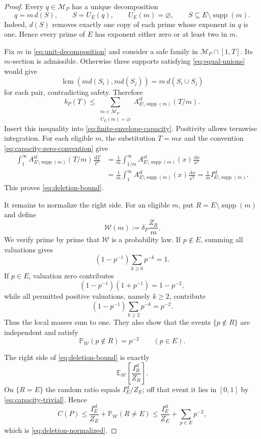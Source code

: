 \documentclass[11pt]{article}
\numberwithin{equation}{section}
\theoremstyle{plain}
\newcommand{\Pp}{\mathbb P}
\newcommand{\E}{\mathbb E}
\newcommand{\1}{\mathbf 1}
\newcommand{\dd}{\,\mathrm d}
\newcommand{\cM}{\mathcal M}
\newcommand{\supp}{\operatorname{supp}}
\newcommand{\lcm}{\operatorname{lcm}}
\begin{document}
\begin{proof}
Every $q\in\cM_P$ has a unique decomposition
\begin{equation}\label{eq:unit-decomposition}
 q=m\,d(S),
 \qquad
 S=U_E(q),
 \qquad
 U_E(m)=\varnothing,
 \qquad
 S\subseteq E\setminus\supp(m).
\end{equation}
Indeed, $d(S)$ removes exactly one copy of each prime whose exponent in
$q$ is one.  Hence every prime of $E$ has exponent either zero or at least
two in $m$.

Fix $m$ in \eqref{eq:unit-decomposition} and consider a safe family in
$\cM_P\cap[1,T]$.  Its $m$-section is admissible.  Otherwise three supports
satisfying \eqref{eq:equal-unions} would give
\[
 \lcm(md(S_i),md(S_j))=m\,d(S_i\cup S_j)
\]
for each pair, contradicting safety.  Therefore
\[
 b_P(T)\le
 \sum_{\substack{m\in\cM_P\\U_E(m)=\varnothing}}
 A_{E\setminus\supp(m)}^{\mathrm{sf}}(T/m).
\]
Insert this inequality into \eqref{eq:finite-envelope-capacity}.  Positivity
allows termwise integration.  For each eligible $m$, the substitution
$T=mx$ and the convention \eqref{eq:capacity-zero-convention} give
\begin{align*}
 \int_1^\infty
 A_{E\setminus\supp(m)}^{\mathrm{sf}}(T/m)\frac{\dd T}{T^2}
 &=\frac1m\int_{1/m}^\infty
 A_{E\setminus\supp(m)}^{\mathrm{sf}}(x)\frac{\dd x}{x^2}\\
 &=\frac1m\int_1^\infty
 A_{E\setminus\supp(m)}^{\mathrm{sf}}(x)\frac{\dd x}{x^2}
 =\frac1m I_{E\setminus\supp(m)}^{\mathrm{sf}}.
\end{align*}
This proves \eqref{eq:deletion-bound}.

It remains to normalize the right side.  For an eligible $m$, put
$R=E\setminus\supp(m)$ and define
\begin{equation}\label{eq:deletion-law}
 \mathcal W(m):=\delta_P\frac{Z_R}{m}.
\end{equation}
We verify prime by prime that $\mathcal W$ is a probability law.  If
$p\notin E$, summing all valuations gives
\[
 (1-p^{-1})\sum_{k\ge0}p^{-k}=1.
\]
If $p\in E$, valuation zero contributes
\[
 (1-p^{-1})(1+p^{-1})=1-p^{-2},
\]
while all permitted positive valuations, namely $k\ge2$, contribute
\[
 (1-p^{-1})\sum_{k\ge2}p^{-k}=p^{-2}.
\]
Thus the local masses sum to one.  They also show that the events
$\{p\notin R\}$ are independent and satisfy
\begin{equation}\label{eq:deletion-error-law}
 \Pp_{\mathcal W}(p\notin R)=p^{-2}\qquad(p\in E).
\end{equation}

The right side of \eqref{eq:deletion-bound} is exactly
\[
 \E_{\mathcal W}\left[\frac{I_R^{\mathrm{sf}}}{Z_R}\right].
\]
On $\{R=E\}$ the random ratio equals $I_E^{\mathrm{sf}}/Z_E$; off that
event it lies in $[0,1]$ by \eqref{eq:capacity-trivial}.  Hence
\[
 C(P)\le\frac{I_E^{\mathrm{sf}}}{Z_E}
          +\Pp_{\mathcal W}(R\ne E)
 \le\frac{I_E^{\mathrm{sf}}}{Z_E}+\sum_{p\in E}p^{-2},
\]
which is \eqref{eq:deletion-normalized}.
\end{proof}
\end{document}
